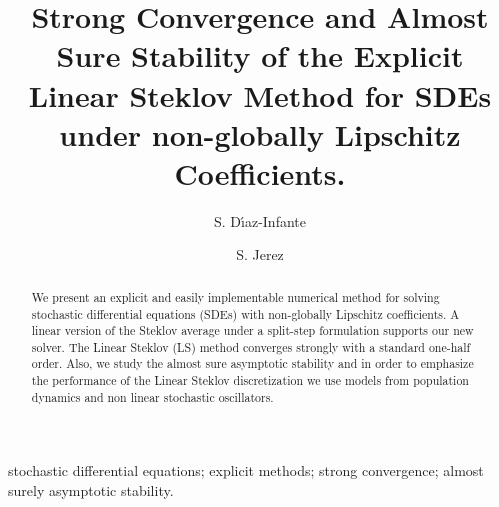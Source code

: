 \documentclass[sort&compress, preprint]{elsarticle}
\theoremstyle{definition}
\theoremstyle{plain}%
\theoremstyle{remark}
\newcommand{\SM}{LS\xspace}
\begin{document}
	\begin{frontmatter}
		\title{
				Strong Convergence and Almost Sure Stability of the Explicit Linear Steklov Method
				for SDEs under non-globally Lipschitz Coefficients.
		}%
		\author[sj]{S. D\'{\i}az-Infante}
		\author[sj]{S. Jerez}
		\address[sj]{Split Step Linear Steklov Method 
		Department of Applied Mathematics, CIMAT, Guanajuato, Gto., Mexico,
		36240.
		}
	\begin{abstract}
		We present an explicit and easily implementable numerical method for
		solving stochastic differential equations (SDEs) with non-globally Lipschitz
		coefficients. A linear version of the Steklov average under a split-step formulation supports our new solver.
		The Linear Steklov (\SM) method converges strongly with a standard 
		one-half order.  Also, we study the almost sure asymptotic stability and in  order to emphasize the 
		performance of the Linear Steklov discretization we use models from population dynamics 
		and non linear stochastic oscillators.
	\end{abstract}
	\begin{keyword}
		stochastic differential equations;
		explicit methods; strong convergence; almost surely asymptotic stability.
	\end{keyword}
	\end{frontmatter}
	\pagebreak
	\tableofcontents
	\pagebreak
	
\end{document}
